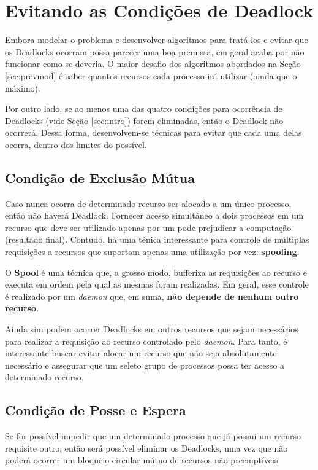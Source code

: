 	\section{Evitando as Condições de Deadlock}
	Embora modelar o problema e desenvolver algoritmos para tratá-los e evitar que os Deadlocks ocorram possa parecer uma boa premissa, em geral acaba por não funcionar como se deveria. O maior desafio dos algoritmos abordados na Seção \ref{sec:prevmod} é saber quantos recursos cada processo irá utilizar (ainda que o máximo).

	Por outro lado, se ao menos uma das quatro condições para ocorrência de Deadlocks (vide Seção \ref{sec:intro}) forem eliminadas, então o Deadlock não ocorrerá. Dessa forma, desenvolvem-se técnicas para evitar que cada uma delas ocorra, dentro dos limites do possível.

	\subsection{Condição de Exclusão Mútua}\label{sec:exmut}
	Caso nunca ocorra de determinado recurso ser alocado a um único processo, então não haverá Deadlock. Fornecer acesso simultâneo a dois processos em um recurso que deve ser utilizado apenas por um pode prejudicar a computação (resultado final). Contudo, há uma ténica interessante para controle de múltiplas requisições a recursos que suportam apenas uma utilização por vez: \textbf{spooling}.

	O \textbf{Spool} é uma técnica que, a grosso modo, bufferiza as requisições ao recurso e executa em ordem pela qual as mesmas foram realizadas. Em geral, esse controle é realizado por um \textit{daemon} que, em suma, \textbf{não depende de nenhum outro recurso}.

	Ainda sim podem ocorrer Deadlocks em outros recursos que sejam necessários para realizar a requisição ao recurso controlado pelo \textit{daemon}. Para tanto, é interessante buscar evitar alocar um recurso que não seja absolutamente necessário e assegurar que um seleto grupo de processos possa ter acesso a determinado recurso.

	\subsection{Condição de Posse e Espera}\label{sec:posesp}
	Se for possível impedir que um determinado processo que já possui um recurso requisite outro, então será possível eliminar os Deadlocks, uma vez que não poderá ocorrer um bloqueio circular mútuo de recursos não-preemptíveis.

